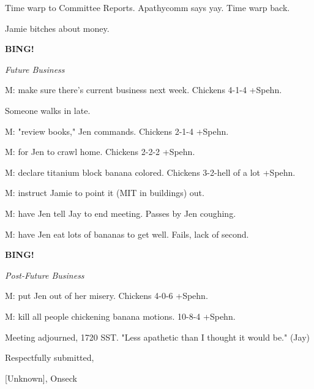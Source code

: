 \documentclass[12pt]{article}
\newcommand{\bing}{{\bf BING!} }
\newcommand{\goto}[1]{\bing \vskip 12pt \centerline{{\em{#1}}}}
\begin{document}
Time warp to Committee Reports. Apathycomm says yay. Time warp back.

Jamie bitches about money.

\goto{Future Business}

M: make sure there's current business next week. Chickens 4-1-4 +Spehn.

Someone walks in late.

M: "review books," Jen commands. Chickens 2-1-4 +Spehn.

M: for Jen to crawl home. Chickens 2-2-2 +Spehn.

M: declare titanium block banana colored. Chickens 3-2-hell of a lot +Spehn.

M: instruct Jamie to point it (MIT in buildings) out.

M: have Jen tell Jay to end meeting. Passes by Jen coughing.

M: have Jen eat lots of bananas to get well. Fails, lack of second.

\goto{Post-Future Business}

M: put Jen out of her misery. Chickens 4-0-6 +Spehn.

M: kill all people chickening banana motions. 10-8-4 +Spehn.

\vspace{12pt}

\noindent
Meeting adjourned, 1720 SST. "Less apathetic than I thought it would be." (Jay)

\vspace{18pt}

\centerline{Respectfully submitted,}
\centerline{[Unknown], Onseck}
\end{document}
